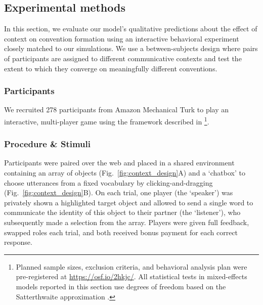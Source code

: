 \subsection{Experimental methods}

In this section, we evaluate our model's qualitative predictions about the effect of context on convention formation using an interactive behavioral experiment closely matched to our simulations.
We use a between-subjects design where pairs of participants are assigned to different communicative contexts and test the extent to which they converge on meaningfully different conventions.

\subsubsection{Participants}

We recruited 278 participants from Amazon Mechanical Turk to play an interactive, multi-player game using the framework described in \footnote{Planned sample sizes, exclusion criteria, and behavioral analysis plan were pre-registered at \url{https://osf.io/2hkjc/}. All statistical tests in mixed-effects models reported in this section use degrees of freedom based on the Satterthwaite approximation \cite{luke2017evaluating}.}.

\subsubsection{Procedure \& Stimuli}
Participants were paired over the web and placed in a shared environment containing an array of objects (Fig.\ \ref{fig:context_design}A) and a `chatbox' to choose utterances from a fixed vocabulary by clicking-and-dragging (Fig.\ \ref{fig:context_design}B). On each trial, one player (the `speaker') was privately shown a highlighted target object and allowed to send a single word to communicate the identity of this object to their partner (the `listener'), who subsequently made a selection from the array. Players were given full feedback, swapped roles each trial, and both received bonus payment for each correct response.

